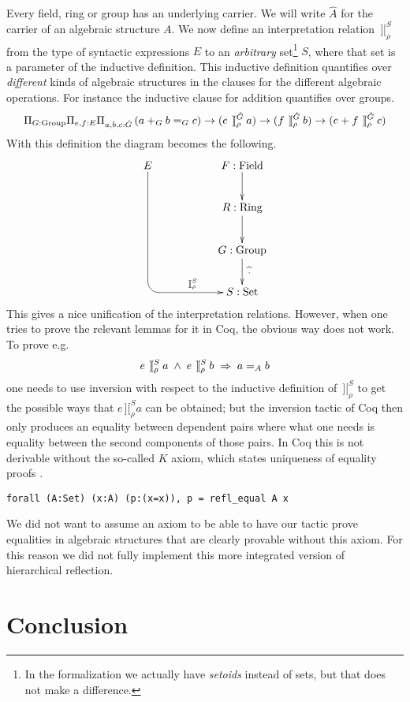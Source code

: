 \documentclass[runningheads]{llncs}
\newcommand{\intII}{\,]\![}
\newcommand{\intrelS}{\mathbin{\intII_\rho^S}}
\newcommand{\intrelX}[1]{\mathbin{\intII_\rho^{#1}}}
\newcommand{\crr}[1]{\hat{#1}}
\newcommand{\tacticname}[1]{\textsf{#1}}
\begin{document}
Every field, ring or group has an underlying carrier.
We will write $\crr{A}$ for the carrier of an algebraic structure $A$.
We now define an interpretation relation $\intrelS$ from the type of syntactic
expressions $E$ to an \emph{arbitrary} set\footnote{In the formalization
we actually have \emph{setoids} instead of sets, but that does not make a difference.}
$S$,
where that set is a parameter of the inductive definition.
This inductive definition quantifies
over \emph{different} kinds of algebraic structures in the clauses for the
different algebraic operations.
For instance the inductive clause for addition quantifies over groups.
$$\Pi_{G:{\rm Group}} \Pi_{e,f:E} \Pi_{a,b,c:\crr{G}} \,
(a +_G b =_G c)
\to(e\intrelX{\crr{G}} a)\to(f\intrelX{\crr{G}} b)\to
(e + f \intrelX{\crr{G}} c)$$
With this definition the diagram becomes the following.
\[
\xymatrix{
E \ar`d[dddr][dddrr]^(.4){\intrelS}
& & F : \mbox{Field}\ar[d] \\
& & R : \mbox{Ring}\ar[d] \\
& & G : \mbox{Group}\ar[d]^{\widehat{\;\mbox{\tiny\strut}\cdot\;}} \\
& & S : \mbox{Set}
}
\]
This gives a nice unification of the interpretation
relations.
However, when one tries to prove the relevant lemmas
for it in Coq, the obvious way does not work.
To prove e.g.
$$
e \intrelS a \;\land\; e \intrelS b \;\Rightarrow\; a =_A b\\
$$
\noindent one needs to use inversion with respect to the inductive definition
of $\intrelS$ to get the possible ways that $e \intrelS a$ can be obtained;
but the \tacticname{inversion} tactic of Coq then only produces
an equality between dependent pairs where what one needs is equality
between the second components of those pairs.
In Coq this is not derivable without the so-called $K$ axiom,
which states uniqueness of equality proofs \cite{hof:str:96}.
\begin{center}
\verb|forall (A:Set) (x:A) (p:(x=x)), p = refl_equal A x|
\end{center}
\noindent We did not want to assume an axiom to be able to have our 
tactic prove equalities in
algebraic structures that are clearly provable without this axiom.
For this reason we did not fully implement this more integrated version
of hierarchical reflection.

\section{Conclusion}\label{conclusion} %
\end{document}
